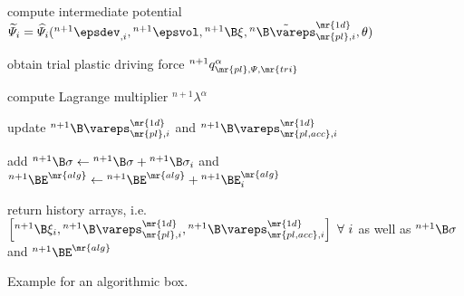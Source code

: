 \begin{algorithm}
\begin{spacing}{0.7}
\begin{algorithmic}[1]
            \State compute intermediate potential $\widetilde{\varPsi}_i = \widehat{\varPsi}_i({}^{n+1}\epsdev_{,i}, {}^{n+1}\epsvol, {}^{n+1}\B\xi, {}^{n}\tilde{\B\vareps}_{\mr{pl},i}^\mr{1d},\theta)$


            \State obtain trial plastic driving force ${}^{n+1}q^\alpha_{\mr{pl},\varPsi,\mr{tri}}$


            \State compute Lagrange multiplier ${}^{n+1}\lambda^\alpha$

            \State update ${}^{n+1}\B\vareps_{\mr{pl},i}^\mr{1d}$ and ${}^{n+1}\B\vareps_{\mr{pl,acc},i}^\mr{1d}$

            \EndIf

            \EndFor

            \State add ${}^{n+1}\B\sigma \leftarrow {}^{n+1}\B\sigma + {}^{n+1}\B\sigma_i$ and ${}^{n+1}\BE^\mr{alg} \leftarrow {}^{n+1}\BE^\mr{alg} + {}^{n+1}\BE^\mr{alg}_i$

            \EndFor

            \State return history arrays, i.e.~$\left[ {}^{n+1}\B\xi_i, {}^{n+1}\B\vareps_{\mr{pl},i}^\mr{1d}, {}^{n+1}\B\vareps_{\mr{pl,acc},i}^\mr{1d} \right] ~ \forall ~ i$ as well as ${}^{n+1}\B\sigma$ and ${}^{n+1}\BE^\mr{alg}$

        \end{algorithmic}
    \end{spacing}

    \caption{ Example for an algorithmic box. }
    \label{algo_example}
\end{algorithm}
